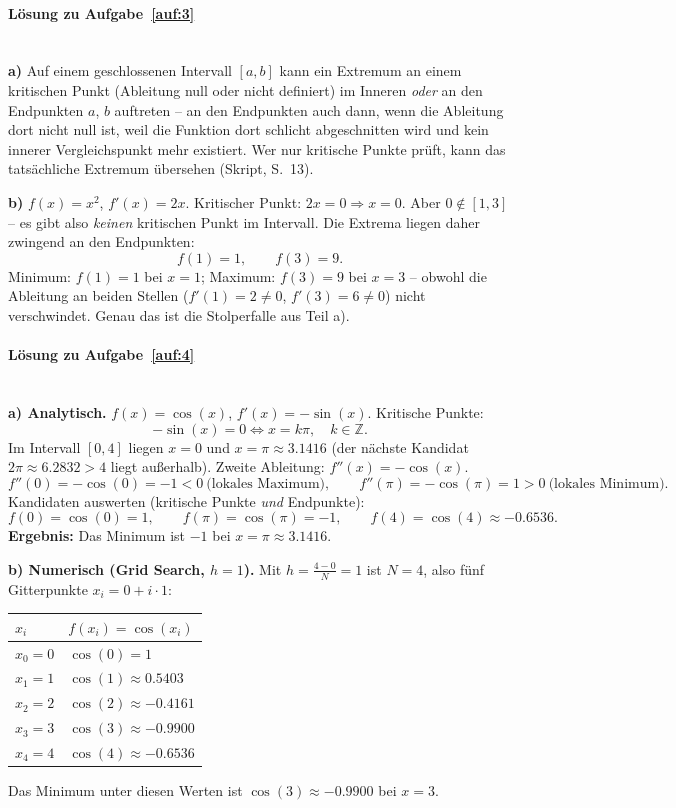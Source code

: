 \documentclass[11pt,a4paper]{scrartcl}
\begin{document}
\paragraph{Lösung zu Aufgabe~\ref{auf:3}}\mbox{}\\[2pt]
\textbf{a)} Auf einem geschlossenen Intervall $[a,b]$ kann ein Extremum an einem kritischen
Punkt (Ableitung null oder nicht definiert) im Inneren \emph{oder} an den Endpunkten $a$,
$b$ auftreten -- an den Endpunkten auch dann, wenn die Ableitung dort nicht null ist, weil
die Funktion dort schlicht \glqq abgeschnitten\grqq{} wird und kein innerer Vergleichspunkt
mehr existiert. Wer nur kritische Punkte prüft, kann das tatsächliche Extremum übersehen
(Skript, S.~13).

\textbf{b)} $f(x) = x^2$, $f'(x) = 2x$. Kritischer Punkt: $2x = 0 \Rightarrow x = 0$.
Aber $0 \notin [1,3]$ -- es gibt also \emph{keinen} kritischen Punkt im Intervall. Die
Extrema liegen daher zwingend an den Endpunkten:
\[
f(1) = 1, \qquad f(3) = 9 .
\]
Minimum: $f(1) = 1$ bei $x = 1$; Maximum: $f(3) = 9$ bei $x = 3$ -- obwohl die Ableitung
an beiden Stellen ($f'(1) = 2 \neq 0$, $f'(3) = 6 \neq 0$) nicht verschwindet. Genau das
ist die Stolperfalle aus Teil a).

\paragraph{Lösung zu Aufgabe~\ref{auf:4}}\mbox{}\\[2pt]
\textbf{a) Analytisch.} $f(x) = \cos(x)$, $f'(x) = -\sin(x)$. Kritische Punkte:
\[
-\sin(x) = 0 \iff x = k\pi, \quad k \in \mathbb{Z}.
\]
Im Intervall $[0,4]$ liegen $x = 0$ und $x = \pi \approx 3.1416$ (der nächste Kandidat
$2\pi \approx 6.2832 > 4$ liegt außerhalb). Zweite Ableitung: $f''(x) = -\cos(x)$.
\[
f''(0) = -\cos(0) = -1 < 0 \ \text{(lokales Maximum)}, \qquad
f''(\pi) = -\cos(\pi) = 1 > 0 \ \text{(lokales Minimum)}.
\]
Kandidaten auswerten (kritische Punkte \emph{und} Endpunkte):
\[
f(0) = \cos(0) = 1, \qquad f(\pi) = \cos(\pi) = -1, \qquad f(4) = \cos(4) \approx -0.6536 .
\]
\textbf{Ergebnis:} Das Minimum ist $-1$ bei $x = \pi \approx 3.1416$.

\textbf{b) Numerisch (Grid Search, $h = 1$).} Mit $h = \frac{4-0}{N} = 1$ ist $N = 4$,
also fünf Gitterpunkte $x_i = 0 + i \cdot 1$:
\begin{center}
\begin{tabular}{ll}
\toprule
$x_i$ & $f(x_i) = \cos(x_i)$ \\
\midrule
$x_0 = 0$ & $\cos(0) = 1$ \\
$x_1 = 1$ & $\cos(1) \approx 0.5403$ \\
$x_2 = 2$ & $\cos(2) \approx -0.4161$ \\
$x_3 = 3$ & $\cos(3) \approx -0.9900$ \\
$x_4 = 4$ & $\cos(4) \approx -0.6536$ \\
\bottomrule
\end{tabular}
\end{center}
Das Minimum unter diesen Werten ist $\cos(3) \approx -0.9900$ bei $x = 3$.
\end{document}
